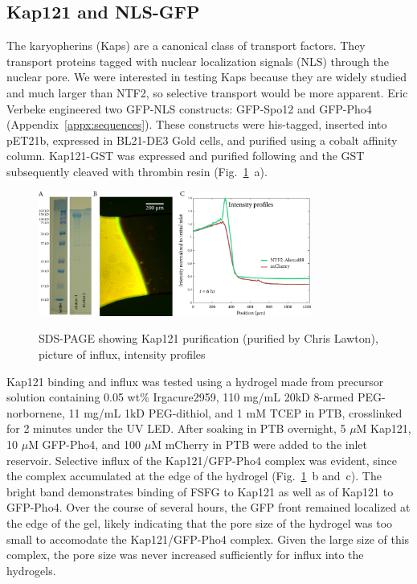 \subsection{Kap121 and NLS-GFP}
The karyopherins (Kaps) are a canonical class of transport factors.  They transport proteins tagged with nuclear localization signals (NLS) through the nuclear pore.  We were interested in testing Kaps because they are widely studied and much larger than NTF2, so selective transport would be more apparent.  Eric Verbeke engineered two GFP-NLS constructs: GFP-Spo12 and GFP-Pho4 (Appendix~\ref{appx:sequences}).  These constructs were his-tagged, inserted into pET21b, expressed in BL21-DE3 Gold cells, and purified using a cobalt affinity column. 
Kap121-GST was expressed and purified following \cite{tetenbaum-novatt12} and the GST subsequently cleaved with thrombin resin (Fig.~\ref{fig:Kap121}~a).
\begin{figure} %
\caption[Kap121 and GFP-NLS cargo.]{SDS-PAGE showing Kap121 purification (purified by Chris Lawton), picture of influx, intensity profiles}
\centering
\includegraphics[width=0.8\textwidth]{figs/ch03/Kap121}
\label{fig:Kap121}
\end{figure} %


Kap121 binding and influx was tested using a hydrogel made from precursor solution containing 0.05 wt\% Irgacure2959, 110 mg/mL 20kD 8-armed PEG-norbornene, 11 mg/mL 1kD PEG-dithiol, and 1 mM TCEP in PTB, crosslinked for 2 minutes under the UV LED.  After soaking in PTB overnight, 5 $\mu$M Kap121, 10 $\mu$M GFP-Pho4, and 100 $\mu$M mCherry in PTB were added to the inlet reservoir.  Selective influx of the Kap121/GFP-Pho4 complex was evident, since the complex accumulated at the edge of the hydrogel (Fig.~\ref{fig:Kap121}~b and~c).  The bright band demonstrates binding of FSFG to Kap121 as well as of Kap121 to GFP-Pho4.  Over the course of several hours, the GFP front remained localized at the edge of the gel, likely indicating that the pore size of the hydrogel was too small to accomodate the Kap121/GFP-Pho4 complex.  Given the large size of this complex, the pore size was never increased sufficiently for influx into the hydrogels.


